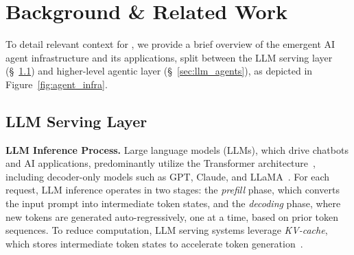 \section{Background \& Related Work}
\label{sec:background}

To detail relevant context for \text{\name}, we provide a brief overview of the emergent AI agent infrastructure and its applications, split between the LLM serving layer (\S~\ref{sec:llm_serving}) and higher-level agentic layer  (\S~\ref{sec:llm_agents}), as depicted in Figure~\ref{fig:agent_infra}.

\subsection{LLM Serving Layer}
\label{sec:llm_serving}
\noindent \textbf{LLM Inference Process.} Large language models (LLMs), which drive chatbots and AI applications, predominantly utilize the Transformer architecture~\cite{transformer}, including decoder-only models such as GPT, Claude, and LLaMA~\cite{gpt,llama,llama2,mistral}. For each request, LLM inference operates in two stages: the \textit{prefill} phase, which converts the input prompt into intermediate token states, and the \textit{decoding} phase, where new tokens are generated auto-regressively, one at a time, based on prior token sequences. To reduce computation, LLM serving systems leverage \textit{KV-cache}, which stores intermediate token states to accelerate token generation~\cite{orca, vllm}.


